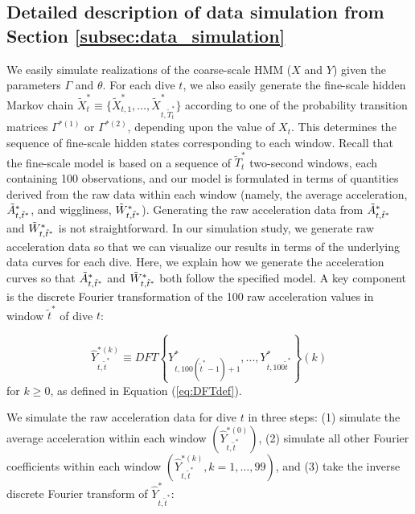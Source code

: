 \subsection{Detailed description of data simulation from Section \ref{subsec:data_simulation}}


\setcounter{equation}{6}   %


We easily simulate realizations of the coarse-scale HMM ($X$ and $Y$) given the parameters $\Gamma$ and $\theta$. For each dive $t$, we also easily generate the fine-scale hidden Markov chain $\tilde X^*_t \equiv \big\{\tilde X^*_{t,1},\ldots,\tilde X^*_{t,\tilde T_t^*}\big\}$ according to one of the probability transition matrices $\Gamma^{*(1)}$ or $\Gamma^{*(2)}$, depending upon the value of $X_t$. This determines the sequence of fine-scale hidden states corresponding to each window. Recall that the fine-scale model is based on a sequence of $\tilde T_t^*$ two-second windows, each containing 100 observations, and our model is formulated in terms of quantities derived from the raw data within each window (namely, the average acceleration, $\tilde{A}^*_{t,\tilde t^*}$, and wiggliness, $\tilde{W}^*_{ t,\tilde t^*}$). Generating the raw acceleration data from $\tilde{A}^*_{t,\tilde t^*}$ and $\tilde{W}^*_{ t,\tilde t^*}$ is not straightforward. In our simulation study, we generate raw acceleration data so that we can visualize our results in terms of the underlying data curves for each dive. Here, we explain how we generate the acceleration curves so that $\tilde{A}^*_{t,\tilde t^*}$ and $\tilde{W}^*_{ t,\tilde t^*}$ both follow the specified model. A key component is the discrete Fourier transformation of the 100 raw acceleration values in window $\tilde{t}^*$ of dive $t$:

\[
    \hat{Y}^{*(k)}_{t,\tilde{t}^*}  \equiv DFT\left\{Y^*_{t,100 (\tilde{t}^*-1) + 1 },\ldots, Y^*_{t,100 \tilde{t}^*}\right\}(k)
\]
for $k \geq 0$, as defined in Equation (\ref{eq:DFTdef}).

We simulate the raw acceleration data for dive $t$ in three steps: (1) simulate the average acceleration within each window $\left(\hat Y^{*(0)}_{t,\tilde t^*}\right)$, (2) simulate all other Fourier coefficients within each window $\left(\hat Y^{*(k)}_{t,\tilde t^*}, k = 1,\ldots,99\right)$, and (3) take the inverse discrete Fourier transform of $\hat{Y}^*_{t,\tilde t^*}$:

